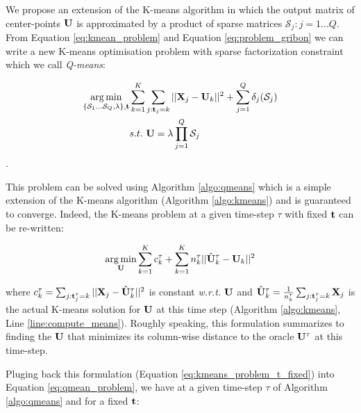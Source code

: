 \documentclass{article}
\begin{document}
We propose an extension of the K-means algorithm in which the output matrix of center-points ${\mathbf{U}}$ is approximated by a product of sparse matrices $\mathcal{S}_j: j = 1 \ldots Q$. From Equation \ref{eq:kmean_problem} and Equation \ref{eq:problem_gribon} we can write a new K-means optimisation problem with sparse factorization constraint which we call \textit{Q-means}:

\begin{equation}
\begin{split}
\label{eq:qmean_problem}
    \operatorname*{arg\,min}_{\{\mathcal{S}_1 \dots \mathcal{S}_Q, \lambda\}, {\mathbf{t}}} & \sum_{k=1}^{K} \sum_{j: {\mathbf{t}}_j = k} ||{\mathbf{X}}_j -{\mathbf{U}}_k||^2 + \sum_{j=1}^{Q} \delta_j(\mathcal{S}_j) \\
    & s.t. ~ {\mathbf{U}} = \lambda \prod_{j=1}^{Q}{\mathcal{S}_j}
\end{split}
\end{equation}.

This problem can be solved using Algorithm \ref{algo:qmeans} which is a simple extension of the K-means algorithm (Algorithm \ref{algo:kmeans}) and is guaranteed to converge. Indeed, the K-means problem at a given time-step $\tau$ with fixed ${\mathbf{t}}$ can be re-written:

\begin{equation}
\label{eq:kmeans_problem_t_fixed}
\begin{split}
 \operatorname*{arg\,min}_{{\mathbf{U}}} & \sum_{k=1}^{K} c_k^\tau + \sum_{k=1}^{K} n_k^\tau||\hat{{\mathbf{U}}}^\tau_k - {\mathbf{U}}_k||^2 \\
\end{split}
\end{equation} 

where $c^\tau_k = \sum_{j: {\mathbf{t}}^\tau_j = k} {||{\mathbf{X}}_j - \hat{{\mathbf{U}}}^\tau_k||^2}$ is constant \textit{w.r.t.} ${\mathbf{U}}$ and $\hat{{\mathbf{U}}}^\tau_k = \frac{1}{n^\tau_k} \sum_{j: {\mathbf{t}}^\tau_j = k} {{\mathbf{X}}_j}$ is the actual K-means solution for ${\mathbf{U}}$ at this time step (Algorithm \ref{algo:kmeans}, Line \ref{line:compute_means}). Roughly speaking, this formulation summarizes to finding the ${\mathbf{U}}$ that minimizes its column-wise distance to the oracle ${\mathbf{U}}^\tau$ at this time-step.

Pluging back this formulation (Equation \ref{eq:kmeans_problem_t_fixed}) into Equation \ref{eq:qmean_problem}, we have at a given time-step $\tau$ of Algorithm \ref{algo:qmeans} and for a fixed ${\mathbf{t}}$:
\end{document}
